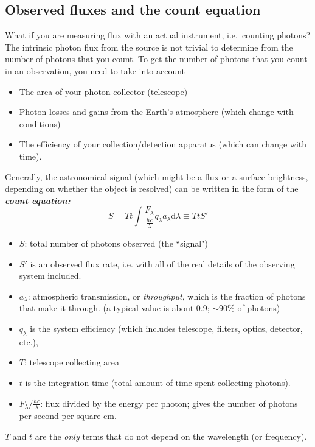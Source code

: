 \documentclass[12pt]{article}
\begin{document}

\subsection*{Observed fluxes and the count equation}
What if you are measuring flux with an actual instrument, i.e.\
counting photons? The intrinsic photon flux from the source is not
trivial to determine from the number of photons that you count. To get
the number of photons that you count in an observation, you need to
take into account
\begin{itemize}
    \item The area of your photon collector (telescope)
    \item Photon losses and gains from the Earth's atmosphere
    (which change with conditions)
    \item The efficiency of your collection/detection
    apparatus (which can change with time).
\end{itemize}
Generally, the astronomical signal (which might be a flux or a
surface brightness, depending on whether the object is resolved)
can be written in the form of the \emph{\textbf{count equation:}}
    $$ S = Tt \int \frac{F_{\lambda}}{\frac{hc}{\lambda}}q_{\lambda}
    a_{\lambda}\textrm{d}\lambda \equiv TtS' $$
    \begin{itemize}
        \item $S$: total number of photons observed (the ``signal")
        \item $S'$ is an observed flux rate,
        i.e. with all of the real details of the observing system included.
        \item $a_{\lambda}$: atmospheric transmission,
        or \emph{throughput}, which is the fraction of photons that
        make it through.
        (a typical value is about 0.9; $\sim$90\% of photons)
        \item $q_{\lambda}$ is the system efficiency
        (which includes telescope, filters, optics, detector, etc.),
        \item $T$: telescope collecting area
        \item $t$ is the integration time
        (total amount of time spent collecting photons).
        \item $F_{\lambda}/\frac{hc}{\lambda}$:
        flux divided by the energy per photon;
        gives the number of photons per second per square cm.
    \end{itemize}
$T$ and $t$ are the \emph{only} terms that do not depend on
the wavelength (or frequency).
\end{document}
